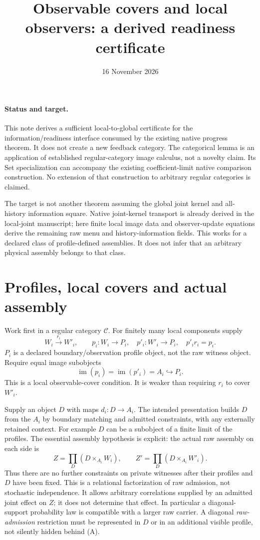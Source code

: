 \documentclass[11pt]{article}
\title{Observable covers and local observers: a derived readiness certificate}
\author{}\date{16 November 2026}
\begin{document}
\maketitle
\paragraph{Status and target.} This note derives a sufficient local-to-global certificate for the information/readiness interface consumed by the existing native progress theorem. It does not create a new feedback category. The categorical lemma is an application of established regular-category image calculus, not a novelty claim. Its Set specialization can accompany the existing coefficient-limit native comparison construction. No extension of that construction to arbitrary regular categories is claimed.

The target is not another theorem assuming the global joint kernel and all-history information square. Native joint-kernel transport is already derived in the local-joint manuscript; here finite local image data and observer-update equations derive the remaining raw menu and history-information fields. This works for a declared class of profile-defined assemblies. It does not infer that an arbitrary physical assembly belongs to that class.

\section{Profiles, local covers and actual assembly}
Work first in a regular category $\mathcal C$. For finitely many local components supply
\[
 W_i\xrightarrow{r_i} W'_i,\qquad
 p_i:W_i\to P_i,\quad p'_i:W'_i\to P_i,\quad p'_i r_i=p_i.
\]
$P_i$ is a declared boundary/observation profile object, not the raw witness object. Require equal image subobjects
\[
 \operatorname{im}(p_i)=\operatorname{im}(p'_i)=A_i\hookrightarrow P_i. \tag{C}
\]
This is a local observable-cover condition. It is weaker than requiring $r_i$ to cover $W'_i$.

Supply an object $D$ with maps $d_i:D\to A_i$. The intended presentation builds $D$ from the $A_i$ by boundary matching and admitted constraints, with any externally retained context. For example $D$ can be a subobject of a finite limit of the profiles. The essential assembly hypothesis is explicit: the actual raw assembly on each side is
\[
 Z=\prod_D(D\times_{A_i}W_i),\qquad
 Z'=\prod_D(D\times_{A_i}W'_i). \tag{A}
\]
Thus there are no further constraints on private witnesses after their profiles and $D$ have been fixed. This is a relational factorization of raw admission, not stochastic independence. It allows arbitrary correlations supplied by an admitted joint effect on $Z$; it does not determine that effect. In particular a diagonal-support probability law is compatible with a larger raw carrier. A diagonal \emph{raw-admission} restriction must be represented in $D$ or in an additional visible profile, not silently hidden behind (A).
\end{document}
